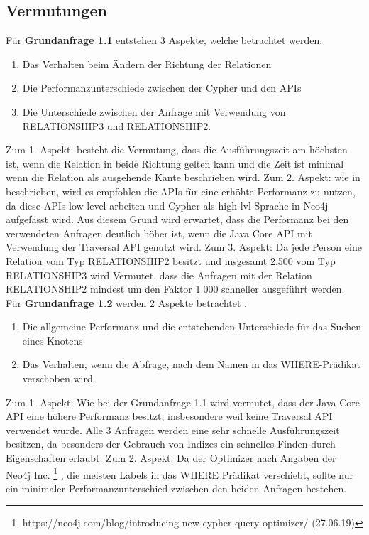 \subsection{Vermutungen}
Für \textbf{Grundanfrage 1.1} entstehen 3 Aspekte, welche betrachtet werden.
\begin{enumerate}
\item Das Verhalten beim Ändern der Richtung der Relationen
\item Die Performanzunterschiede zwischen der Cypher und den APIs
\item Die Unterschiede zwischen der Anfrage mit Verwendung von RELATIONSHIP3 und RELATIONSHIP2.
\end{enumerate}
Zum 1. Aspekt: besteht die Vermutung, dass die Ausführungszeit am höchsten ist, wenn die Relation in beide Richtung gelten kann und die Zeit ist minimal wenn die Relation als ausgehende Kante beschrieben wird. \newline
 Zum 2. Aspekt: wie in \parencite{raj2015neo4j} beschrieben, wird es empfohlen die APIs für eine erhöhte Performanz zu nutzen, da diese APIs low-level arbeiten und Cypher als high-lvl Sprache in Neo4j aufgefasst wird. Aus diesem Grund wird erwartet, dass die Performanz bei den verwendeten Anfragen deutlich höher ist, wenn die Java Core API mit Verwendung der Traversal API genutzt wird. \newline
Zum 3. Aspekt: Da jede Person eine Relation vom Typ RELATIONSHIP2 besitzt und insgesamt 2.500 vom Typ RELATIONSHIP3 wird Vermutet, dass die Anfragen mit der Relation RELATIONSHIP2 mindest um den Faktor 1.000 schneller ausgeführt werden. \newline \newline
Für \textbf{Grundanfrage 1.2} werden 2 Aspekte betrachtet .
\begin{enumerate}
	\item Die allgemeine Performanz und die entstehenden Unterschiede für das Suchen eines Knotens
	\item Das Verhalten, wenn die Abfrage, nach dem Namen in das WHERE-Prädikat verschoben wird.
\end{enumerate}
Zum 1. Aspekt: Wie bei der Grundanfrage 1.1 wird vermutet, dass der Java Core API eine höhere Performanz besitzt, insbesondere weil keine Traversal API verwendet wurde. Alle 3 Anfragen werden eine sehr schnelle Ausführungszeit besitzen, da besonders der Gebrauch von Indizes ein schnelles Finden durch Eigenschaften erlaubt. \newline
Zum 2. Aspekt: Da der Optimizer nach Angaben der Neo4j Inc. \footnote{https://neo4j.com/blog/introducing-new-cypher-query-optimizer/ (27.06.19)} , die meisten Labels in das WHERE Prädikat verschiebt, sollte nur ein minimaler Performanzunterschied zwischen den beiden Anfragen bestehen. \newline \newline

